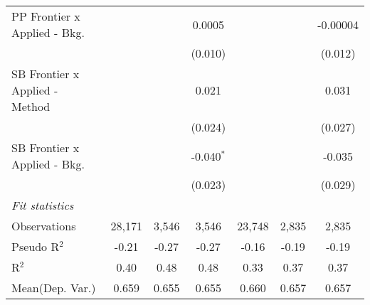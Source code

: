 \begin{tabular}{lcccccc}
   PP Frontier x Applied - Bkg.   &              &              & 0.0005         &                &             & -0.00004\\   
                                  &              &              & (0.010)        &                &             & (0.012)\\   
   SB Frontier x Applied - Method &              &              & 0.021          &                &             & 0.031\\   
                                  &              &              & (0.024)        &                &             & (0.027)\\   
   SB Frontier x Applied - Bkg.   &              &              & -0.040$^{*}$   &                &             & -0.035\\   
                                  &              &              & (0.023)        &                &             & (0.029)\\   
   \midrule
   \emph{Fit statistics}\\
   Observations                   & 28,171       & 3,546        & 3,546          & 23,748         & 2,835       & 2,835\\  
   Pseudo R$^2$                   & -0.21        & -0.27        & -0.27          & -0.16          & -0.19       & -0.19\\  
   R$^2$                          & 0.40         & 0.48         & 0.48           & 0.33           & 0.37        & 0.37\\  
Mean(Dep. Var.) & 0.659 & 0.655 & 0.655 & 0.660 & 0.657 & 0.657 \\
   

\end{tabular}
